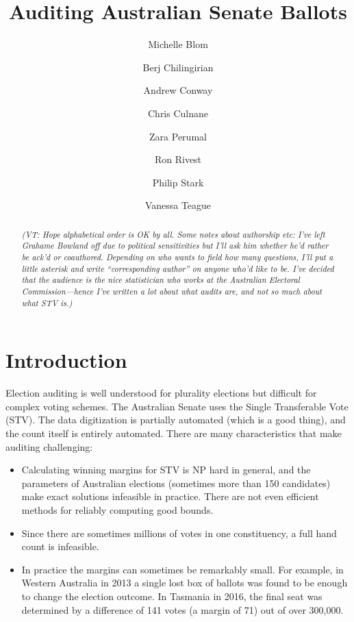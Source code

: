 \documentclass[10pt,a4paper]{article}
\newcommand{\VTNote}[1]{{\it(VT: #1)}}
\begin{document}
\title{Auditing Australian Senate Ballots}
\author{Michelle Blom \and  Berj Chilingirian \and  Andrew Conway \and Chris Culnane \and 
Zara Perumal \and Ron Rivest 
 \and Philip Stark \and Vanessa Teague}
\maketitle

\tableofcontents

\begin{abstract}
\VTNote{Hope alphabetical order is OK by all.  Some notes about authorship etc: I've left Grahame Bowland off due to political sensitivities but I'll ask him whether he'd rather be ack'd or coauthored.  Depending on who wants to field how many questions, I'll put a little asterisk and write ``corresponding author'' on anyone who'd like to be.  I've decided that the audience is the nice statistician who works at the Australian Electoral Commission---hence I've written a lot about what audits are, and not so much about what STV is.}
\end{abstract}

\section{Introduction}
Election auditing is well understood for plurality elections but difficult for complex voting schemes.  The Australian Senate uses the Single Transferable Vote (STV).  The data digitization is partially automated (which is a good thing), and the count itself is entirely automated.  There are many characteristics that make auditing challenging:

\begin{itemize}
\item Calculating winning margins for STV is NP hard in general, and the parameters of Australian elections (sometimes more than 150 candidates) make exact solutions infeasible in practice.  There are not even efficient methods for reliably computing good bounds. 	
\item Since there are sometimes millions of votes in one constituency, a full hand count is infeasible.
\item In practice the margins can sometimes be remarkably small.  For example, in Western Australia in 2013 a single lost box of ballots was found to be enough to change the election outcome.  In Tasmania in 2016, the final seat was determined by a difference of 141 votes 
(a margin of 71) out of over 300,000.	
\end{itemize}
\end{document}
